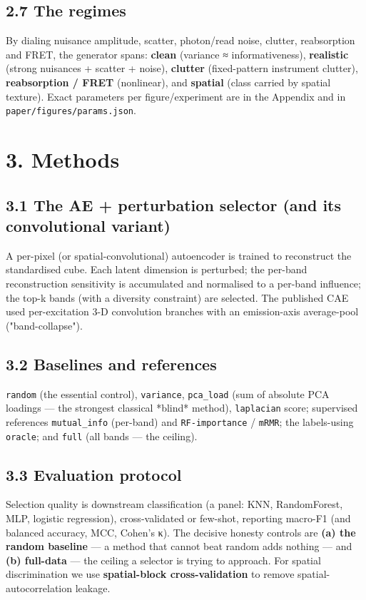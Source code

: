 \documentclass[11pt]{article}
\newcommand{\code}[1]{\texttt{\textcolor{codecol}{#1}}}
\begin{document}
\subsection*{2.7 The regimes}
By dialing nuisance amplitude, scatter, photon/read noise, clutter, reabsorption and FRET, the generator
spans: \textbf{clean} (variance ≈ informativeness), \textbf{realistic} (strong nuisances + scatter + noise),
\textbf{clutter} (fixed-pattern instrument clutter), \textbf{reabsorption / FRET} (nonlinear), and \textbf{spatial}
(class carried by spatial texture). Exact parameters per figure/experiment are in the Appendix and in
\code{paper/figures/params.json}.
\section*{3. Methods}
\subsection*{3.1 The AE + perturbation selector (and its convolutional variant)}
A per-pixel (or spatial-convolutional) autoencoder is trained to reconstruct the standardised cube. Each
latent dimension is perturbed; the per-band reconstruction sensitivity is accumulated and normalised to a
per-band influence; the top-k bands (with a diversity constraint) are selected. The published CAE used
per-excitation 3-D convolution branches with an emission-axis average-pool ("band-collapse").
\subsection*{3.2 Baselines and references}
\code{random} (the essential control), \code{variance}, \code{pca\_load} (sum of absolute PCA loadings — the strongest
classical *blind* method), \code{laplacian} score; supervised references \code{mutual\_info} (per-band) and
\code{RF-importance} / \code{mRMR}; the labels-using \code{oracle}; and \code{full} (all bands — the ceiling).
\subsection*{3.3 Evaluation protocol}
Selection quality is downstream classification (a panel: KNN, RandomForest, MLP, logistic regression),
cross-validated or few-shot, reporting macro-F1 (and balanced accuracy, MCC, Cohen's κ). The decisive
honesty controls are \textbf{(a) the random baseline} — a method that cannot beat random adds nothing — and
\textbf{(b) full-data} — the ceiling a selector is trying to approach. For spatial discrimination we use
\textbf{spatial-block cross-validation} to remove spatial-autocorrelation leakage.
\end{document}
